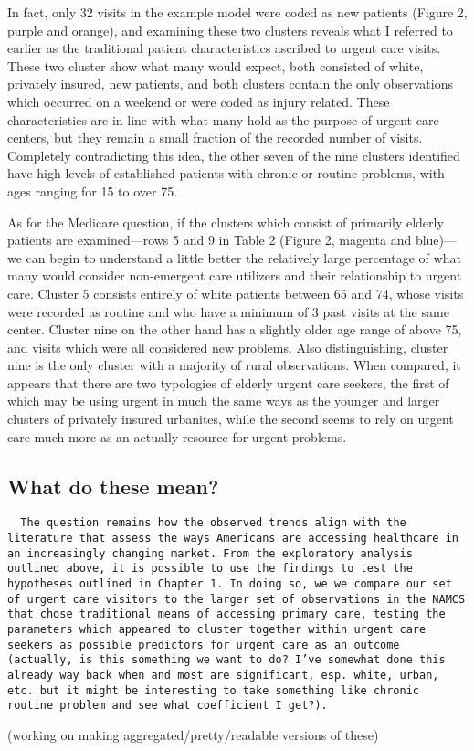 \documentclass[12pt,twoside]{reedthesis}
\begin{document}
  In fact, only 32 visits in the example model were coded as new patients
  (Figure 2, purple and orange), and examining these two clusters reveals
  what I referred to earlier as the traditional patient characteristics
  ascribed to urgent care visits. These two cluster show what many would
  expect, both consisted of white, privately insured, new patients, and
  both clusters contain the only observations which occurred on a weekend
  or were coded as injury related. These characteristics are in line with
  what many hold as the purpose of urgent care centers, but they remain a
  small fraction of the recorded number of visits. Completely
  contradicting this idea, the other seven of the nine clusters identified
  have high levels of established patients with chronic or routine
  problems, with ages ranging for 15 to over 75.
  
  As for the Medicare question, if the clusters which consist of primarily
  elderly patients are examined---rows 5 and 9 in Table 2 (Figure 2,
  magenta and blue)---we can begin to understand a little better the
  relatively large percentage of what many would consider non-emergent
  care utilizers and their relationship to urgent care. Cluster 5 consists
  entirely of white patients between 65 and 74, whose visits were recorded
  as routine and who have a minimum of 3 past visits at the same center.
  Cluster nine on the other hand has a slightly older age range of above
  75, and visits which were all considered new problems. Also
  distinguishing, cluster nine is the only cluster with a majority of
  rural observations. When compared, it appears that there are two
  typologies of elderly urgent care seekers, the first of which may be
  using urgent in much the same ways as the younger and larger clusters of
  privately insured urbanites, while the second seems to rely on urgent
  care much more as an actually resource for urgent problems.
  
  \subsection{What do these mean?}\label{what-do-these-mean}
  
  \begin{verbatim}
  The question remains how the observed trends align with the literature that assess the ways Americans are accessing healthcare in an increasingly changing market. From the exploratory analysis outlined above, it is possible to use the findings to test the hypotheses outlined in Chapter 1. In doing so, we we compare our set of urgent care visitors to the larger set of observations in the NAMCS that chose traditional means of accessing primary care, testing the parameters which appeared to cluster together within urgent care seekers as possible predictors for urgent care as an outcome (actually, is this something we want to do? I’ve somewhat done this already way back when and most are significant, esp. white, urban, etc. but it might be interesting to take something like chronic routine problem and see what coefficient I get?). 
  \end{verbatim}
  
  (working on making aggregated/pretty/readable versions of these)


\end{document}
